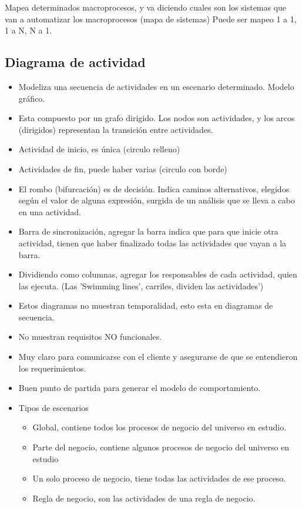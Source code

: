 \documentclass[titlepage,a4paper]{article}
\begin{document}
Mapea determinados macroprocesos, y va diciendo cuales son los sistemas que van a automatizar los macroprocesos (mapa de sistemas) Puede ser mapeo 1 a 1, 1 a N, N a 1.

\subsection{Diagrama de actividad}
    \begin{itemize}
        \item Modeliza una secuencia de actividades en un escenario determinado. Modelo gráfico.
        \item Esta compuesto por un grafo dirigido. Los nodos son actividades, y los arcos (dirigidos) representan la transición entre actividades.
        \item Actividad de inicio, es única (circulo relleno) 
        \item Actividades de fin, puede haber varias (circulo con borde)
        \item El rombo (bifurcación) es de decisión. Indica caminos alternativos, elegidos según el valor de alguna expresión, surgida de un análisis que se lleva a cabo en una actividad.
        \item Barra de sincronización, agregar la barra indica que para que inicie otra actividad, tienen que haber finalizado todas las actividades que vayan a la barra.
        \item Dividiendo como columnas, agregar los responsables de cada actividad, quien las ejecuta. (Las 'Swimming lines', carriles, dividen las actividades')
        \item Estos diagramas no muestran temporalidad, esto esta en diagramas de secuencia.
        \item No muestran requisitos NO funcionales.
        \item Muy claro para comunicarse con el cliente y asegurarse de que se entendieron los requerimientos.
        \item Buen punto de partida para generar el modelo de comportamiento.
        \item Tipos de escenarios
        \begin{itemize}
            \item Global, contiene todos los procesos de negocio del universo en estudio.
            \item Parte del negocio, contiene algunos procesos de negocio del universo en estudio
            \item Un solo proceso de negocio, tiene todas las actividades de ese proceso.
            \item Regla de negocio, son las actividades de una regla de negocio.
        \end{itemize}
    \end{itemize}
\end{document}
